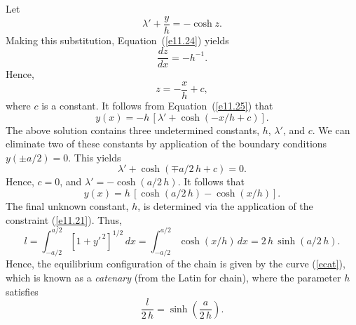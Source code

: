 Let 
\begin{equation}\label{e11.25}
\lambda' + \frac{y}{h} = -\cosh z.
\end{equation}
Making this substitution, Equation~(\ref{e11.24}) yields
\begin{equation}
\frac{dz}{dx} = -h^{-1}.
\end{equation}
Hence, 
\begin{equation}
z =-\frac{x}{h} + c,
\end{equation}
where  $c$ is a constant. It follows from Equation~(\ref{e11.25}) that 
\begin{equation}
y(x) =-h\,[\lambda' + \cosh(-x/h + c)].
\end{equation}
The above solution contains three undetermined constants, $h$, $\lambda'$, and $c$. We can
eliminate two of these constants by application of the boundary
conditions $y(\pm a/2)= 0$. This yields
\begin{equation}
\lambda' + \cosh(\mp a/2\,h + c) = 0.
\end{equation}
Hence, $c=0$, and $\lambda' = - \cosh (a/2\,h)$. It follows that
\begin{equation}\label{ecat}
y(x) = h\,[\cosh(a/2\,h) - \cosh(x/h)].
\end{equation}
The final unknown constant, $h$, is determined via the application of
the constraint (\ref{e11.21}). Thus,
\begin{equation}
l= \int_{-a/2}^{a/2}[1+y'^{\,2}]^{1/2}\,dx = \int_{-a/2}^{a/2} \cosh(x/h) \,dx = 2\,h\,\sinh(a/2\,h).
\end{equation}
Hence, the equilibrium configuration of the chain is given by the curve
(\ref{ecat}), which is known as a {\em catenary}\/ (from the Latin for chain), where the parameter $h$ satisfies
\begin{equation}
\frac{l}{2\,h} = \sinh\left(\frac{a}{2\,h}\right).
\end{equation}

